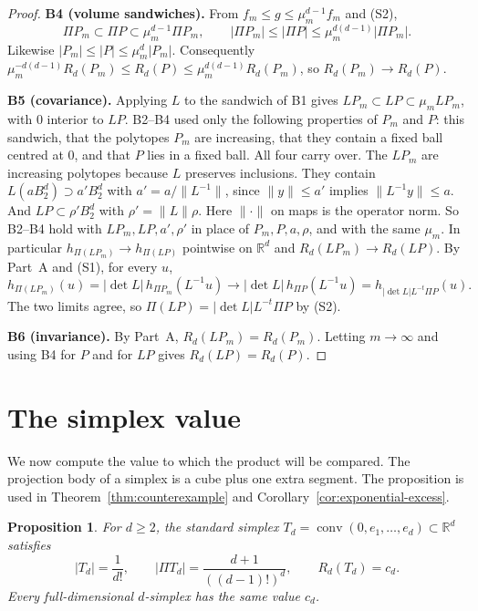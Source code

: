 \documentclass[11pt]{article}
\newtheorem{proposition}[theorem]{Proposition}
\newcommand{\R}{\mathbb R}
\DeclareMathOperator{\conv}{conv}
\newcommand{\step}[1]{\smallskip\noindent\textbf{#1}}
\begin{document}
\begin{proof}
\step{B4 (volume sandwiches).} From \(f_m\le g\le\mu_m^{d-1}f_m\) and (S2),
\[
 \Pi P_m\subset\Pi P\subset\mu_m^{d-1}\Pi P_m,
 \qquad
 |\Pi P_m|\le|\Pi P|\le\mu_m^{d(d-1)}|\Pi P_m|.
\]
Likewise \(|P_m|\le|P|\le\mu_m^d|P_m|\). Consequently
\(\mu_m^{-d(d-1)}R_d(P_m)\le R_d(P)\le\mu_m^{d(d-1)}R_d(P_m)\), so
\(R_d(P_m)\to R_d(P)\).

\step{B5 (covariance).} Applying \(L\) to the sandwich of B1 gives
\(LP_m\subset LP\subset\mu_mLP_m\), with \(0\) interior to \(LP\). B2--B4
used only the following properties of \(P_m\) and \(P\): this sandwich,
that the polytopes \(P_m\) are increasing, that they contain a fixed ball
centred at \(0\), and that \(P\) lies in a fixed ball. All four carry
over. The \(LP_m\) are increasing polytopes because \(L\) preserves
inclusions. They contain \(L(aB_2^d)\supset a'B_2^d\) with
\(a'=a/\|L^{-1}\|\), since \(\|y\|\le a'\) implies \(\|L^{-1}y\|\le a\).
And \(LP\subset\rho'B_2^d\) with \(\rho'=\|L\|\rho\). Here \(\|\cdot\|\)
on maps is the operator norm. So B2--B4 hold with \(LP_m,LP,a',\rho'\) in
place of \(P_m,P,a,\rho\), and with the same \(\mu_m\). In particular
\(h_{\Pi(LP_m)}\to h_{\Pi(LP)}\) pointwise on \(\R^d\) and
\(R_d(LP_m)\to R_d(LP)\). By Part~A and (S1), for every \(u\),
\[
 h_{\Pi(LP_m)}(u)=|\det L|\,h_{\Pi P_m}(L^{-1}u)
 \longrightarrow|\det L|\,h_{\Pi P}(L^{-1}u)
 =h_{|\det L|L^{-t}\Pi P}(u).
\]
The two limits agree, so \(\Pi(LP)=|\det L|L^{-t}\Pi P\) by (S2).

\step{B6 (invariance).} By Part~A, \(R_d(LP_m)=R_d(P_m)\). Letting
\(m\to\infty\) and using B4 for \(P\) and for \(LP\) gives
\(R_d(LP)=R_d(P)\).
\end{proof}

\section{The simplex value}\label{sec:simplex}

We now compute the value to which the product will be compared. The
projection body of a simplex is a cube plus one extra segment. The
proposition is used in Theorem~\ref{thm:counterexample} and
Corollary~\ref{cor:exponential-excess}.

\begin{proposition}\label{prop:simplex}
For \(d\ge2\), the standard simplex
\(T_d=\conv(0,e_1,\ldots,e_d)\subset\R^d\) satisfies
\[
 |T_d|=\frac1{d!},\qquad
 |\Pi T_d|=\frac{d+1}{((d-1)!)^d},\qquad
 R_d(T_d)=c_d.
\]
Every full-dimensional \(d\)-simplex has the same value \(c_d\).
\end{proposition}
\end{document}
